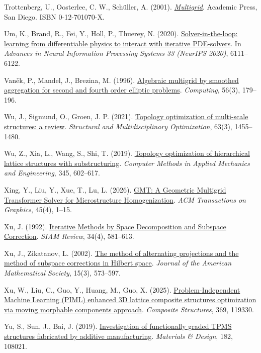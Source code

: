 \documentclass[preprint,12pt,authoryear]{elsarticle}
\begin{document}
Trottenberg, U., Oosterlee, C. W., Schüller, A. (2001). \href{https://shop.elsevier.com/books/multigrid/trottenberg/978-0-12-701070-0}{\emph{Multigrid}}. Academic Press, San Diego. ISBN 0-12-701070-X.

Um, K., Brand, R., Fei, Y., Holl, P., Thuerey, N. (2020). \href{https://proceedings.neurips.cc/paper/2020/hash/43e4e6a6f341e00671e123714de019a8-Abstract.html}{Solver-in-the-loop: learning from differentiable physics to interact with iterative PDE-solvers}. In \emph{Advances in Neural Information Processing Systems 33 (NeurIPS 2020)}, 6111--6122.

Vaněk, P., Mandel, J., Brezina, M. (1996). \href{https://doi.org/10.1007/BF02238511}{Algebraic multigrid by smoothed aggregation for second and fourth order elliptic problems}. \emph{Computing}, 56(3), 179--196.

Wu, J., Sigmund, O., Groen, J. P. (2021). \href{https://doi.org/10.1007/s00158-021-02881-8}{Topology optimization of multi-scale structures: a review}. \emph{Structural and Multidisciplinary Optimization}, 63(3), 1455--1480.

Wu, Z., Xia, L., Wang, S., Shi, T. (2019). \href{https://doi.org/10.1016/j.cma.2018.11.003}{Topology optimization of hierarchical lattice structures with substructuring}. \emph{Computer Methods in Applied Mechanics and Engineering}, 345, 602--617.

Xing, Y., Liu, Y., Xue, T., Lu, L. (2026). \href{https://doi.org/10.1145/3811333}{GMT: A Geometric Multigrid Transformer Solver for Microstructure Homogenization}. \emph{ACM Transactions on Graphics}, 45(4), 1--15.

Xu, J. (1992). \href{https://doi.org/10.1137/1034116}{Iterative Methods by Space Decomposition and Subspace Correction}. \emph{SIAM Review}, 34(4), 581--613.

Xu, J., Zikatanov, L. (2002). \href{https://doi.org/10.1090/S0894-0347-02-00398-3}{The method of alternating projections and the method of subspace corrections in Hilbert space}. \emph{Journal of the American Mathematical Society}, 15(3), 573--597.

Xu, W., Liu, C., Guo, Y., Huang, M., Guo, X. (2025). \href{https://doi.org/10.1016/j.compstruct.2025.119330}{Problem-Independent Machine Learning (PIML) enhanced 3D lattice composite structures optimization via moving morphable components approach}. \emph{Composite Structures}, 369, 119330.

Yu, S., Sun, J., Bai, J. (2019). \href{https://doi.org/10.1016/j.matdes.2019.108021}{Investigation of functionally graded TPMS structures fabricated by additive manufacturing}. \emph{Materials \& Design}, 182, 108021.
\end{document}
